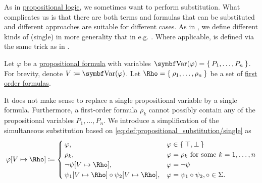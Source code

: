 \begin{definition}\label{def:first_order_substitution}
  As in \hyperref[subsec:propositional_logic]{propositional logic}, we sometimes want to perform substitution. What complicates us is that there are both terms and formulas that can be substituted and different approaches are suitable for different cases. As in , we define different kinds of (single)  in more generality that in e.g. \cite[def. 14.25]{OpenLogic20201202}. Where applicable,  is defined via the same trick as in .

  \begin{DefEnum}
     Let \( \varphi \) be a \hyperref[def:propositional_language/formula]{propositional formula} with variables \( \Bold{Var}(\varphi) = \Set{ P_1, \ldots, P_n } \). For brevity, denote \( V \coloneqq \Bold{Var}(\varphi) \). Let \( \Rho = \Set{ \rho_1, \ldots, \rho_n } \) be a set of \hyperref[def:first_order_language/formula]{first order formulas}.

    It does not make sense to replace a single propositional variable by a single formula. Furthermore, a first-order formula \( \rho_k \) cannot possibly contain any of the propositional variables \( P_1, \ldots, P_n \). We introduce a simplification of the simultaneous substitution based on \eqref{eq:def:propositional_substitution/single} as
    \begin{equation}\label{eq:def:first_order_substitution/predicate}
      \varphi[V \mapsto \Rho] \coloneqq \begin{cases}
        \varphi,                                             &\varphi \in \Set{ \top, \bot } \\
        \rho_k,                                              &\varphi = \rho_k \T{for some} k = 1, \ldots, n \\
        \neg \psi[V \mapsto \Rho],                           &\varphi = \neg \psi \\
        \psi_1[V \mapsto \Rho] \circ \psi_2[V \mapsto \Rho], &\varphi = \psi_1 \circ \psi_2, \circ \in \Sigma.
      \end{cases}
    \end{equation}


\end{DefEnum}
\end{definition}
